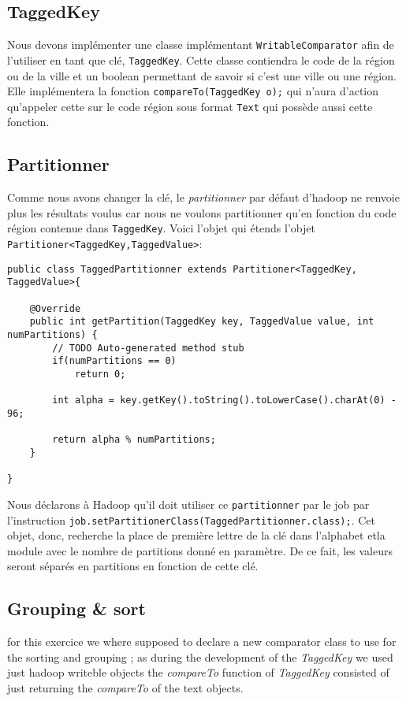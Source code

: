 \documentclass[a4paper]{article}
\begin{document}
\subsection{TaggedKey}
Nous devons implémenter une classe implémentant \verb?WritableComparator? afin de l'utiliser en tant que clé, \verb?TaggedKey?. Cette classe contiendra le code de la région ou de la ville et un boolean permettant de savoir si c'est une ville ou une région. Elle implémentera la fonction \verb?compareTo(TaggedKey o);? qui n'aura d'action qu'appeler cette sur le code région sous format \verb?Text? qui possède aussi cette fonction.

\subsection{Partitionner}
Comme nous avons changer la clé, le \textit{partitionner} par défaut d'hadoop ne renvoie plus les résultats voulus car nous ne voulons partitionner qu'en fonction du code région contenue dans \verb?TaggedKey?. Voici l'objet qui étends l'objet \verb?Partitioner<TaggedKey,TaggedValue>?:

\begin{lstlisting}
public class TaggedPartitionner extends Partitioner<TaggedKey, TaggedValue>{

	@Override
	public int getPartition(TaggedKey key, TaggedValue value, int numPartitions) {
		// TODO Auto-generated method stub
		if(numPartitions == 0)
			return 0;
		
		int alpha = key.getKey().toString().toLowerCase().charAt(0) - 96;
		
		return alpha % numPartitions;
	}

}
\end{lstlisting}

Nous déclarons à Hadoop qu'il doit utiliser ce \verb?partitionner? par le job par l'instruction \verb?job.setPartitionerClass(TaggedPartitionner.class);?. Cet objet, donc, recherche la place de première lettre de la clé dans l'alphabet etla module avec le nombre de partitions donné en paramètre. De ce fait, les valeurs seront séparés en partitions en fonction de cette clé.

\subsection{Grouping & sort}

for this exercice we where supposed to declare a new comparator class to use for
the sorting and grouping ;
as during the development of the \textit{TaggedKey} we used just hadoop writeble
objects the \textit{ compareTo } function of \textit{TaggedKey} consisted of just
returning the \textit{compareTo} of the text objects.
\end{document}
